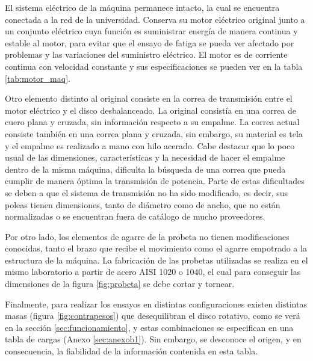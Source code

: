 El sistema eléctrico de la máquina permanece intacto, la cual se encuentra conectada a la red de la universidad. Conserva su motor eléctrico original junto a un conjunto eléctrico cuya función es suministrar energía de manera continua y estable al motor, para evitar que el ensayo de fatiga se pueda ver afectado por problemas y las variaciones del suministro eléctrico. El motor es de corriente continua con velocidad constante y sus especificaciones se pueden ver en la tabla \ref{tab:motor_maq}.

Otro elemento distinto al original consiste en la correa de transmisión entre el motor eléctrico y el disco desbalanceado. La original consistía en una correa de cuero plana y cruzada, sin información respecto a su empalme. La correa actual consiste también en una correa plana y cruzada, sin embargo, su material es tela y el empalme es realizado a mano con hilo acerado. Cabe destacar que lo poco usual de las dimensiones, características y la necesidad de hacer el empalme dentro de la misma máquina, dificulta la búsqueda de una correa que pueda cumplir de manera óptima la transmisión de potencia. Parte de estas dificultades se deben a que el sistema de transmisión no ha sido modificado, es decir, sus poleas tienen dimensiones, tanto de diámetro como de ancho, que no están normalizadas o se encuentran fuera de catálogo de mucho proveedores. 

Por otro lado, los elementos de agarre de la probeta no tienen modificaciones conocidas, tanto el brazo que recibe el movimiento como el agarre empotrado a la estructura de la máquina. La fabricación de las probetas utilizadas se realiza en el mismo laboratorio a partir de acero AISI 1020 o 1040, el cual para conseguir las dimensiones de la figura \ref{fig:probeta} se debe cortar y tornear.

Finalmente, para realizar los ensayos en distintas configuraciones existen distintas masas (figura \ref{fig:contrapesos}) que desequilibran el disco rotativo, como se verá en la sección \ref{sec:funcionamiento}, y estas combinaciones se especifican en una tabla de cargas (Anexo \ref{sec:anexob1}). Sin embargo, se desconoce el origen, y en consecuencia, la fiabilidad de la información contenida en esta tabla.

